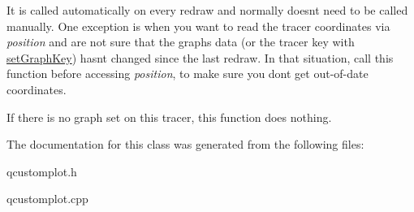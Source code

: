 It is called automatically on every redraw and normally doesn\textquotesingle{}t need to be called manually. One exception is when you want to read the tracer coordinates via {\itshape position} and are not sure that the graph\textquotesingle{}s data (or the tracer key with \hyperlink{classQCPItemTracer_a6840143b42f3b685cedf7c6d83a704c8}{set\+Graph\+Key}) hasn\textquotesingle{}t changed since the last redraw. In that situation, call this function before accessing {\itshape position}, to make sure you don\textquotesingle{}t get out-\/of-\/date coordinates.

If there is no graph set on this tracer, this function does nothing. 

The documentation for this class was generated from the following files\+:\begin{DoxyCompactItemize}
\item 
qcustomplot.\+h\item 
qcustomplot.\+cpp\end{DoxyCompactItemize}
